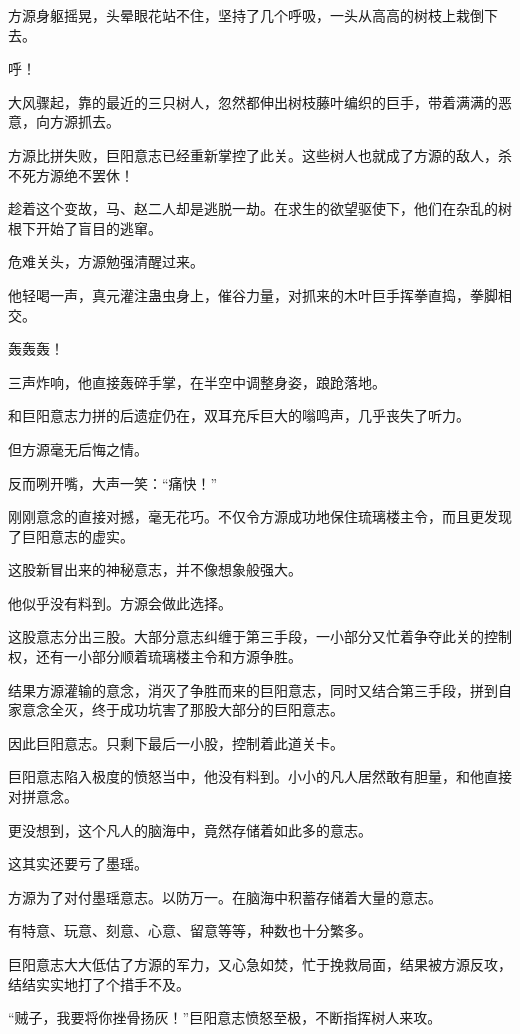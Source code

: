\begin{this_body}
方源身躯摇晃，头晕眼花站不住，坚持了几个呼吸，一头从高高的树枝上栽倒下去。

呼！

大风骤起，靠的最近的三只树人，忽然都伸出树枝藤叶编织的巨手，带着满满的恶意，向方源抓去。

方源比拼失败，巨阳意志已经重新掌控了此关。这些树人也就成了方源的敌人，杀不死方源绝不罢休！

趁着这个变故，马、赵二人却是逃脱一劫。在求生的欲望驱使下，他们在杂乱的树根下开始了盲目的逃窜。

危难关头，方源勉强清醒过来。

他轻喝一声，真元灌注蛊虫身上，催谷力量，对抓来的木叶巨手挥拳直捣，拳脚相交。

轰轰轰！

三声炸响，他直接轰碎手掌，在半空中调整身姿，踉跄落地。

和巨阳意志力拼的后遗症仍在，双耳充斥巨大的嗡鸣声，几乎丧失了听力。

但方源毫无后悔之情。

反而咧开嘴，大声一笑：“痛快！”

刚刚意念的直接对撼，毫无花巧。不仅令方源成功地保住琉璃楼主令，而且更发现了巨阳意志的虚实。

这股新冒出来的神秘意志，并不像想象般强大。

他似乎没有料到。方源会做此选择。

这股意志分出三股。大部分意志纠缠于第三手段，一小部分又忙着争夺此关的控制权，还有一小部分顺着琉璃楼主令和方源争胜。

结果方源灌输的意念，消灭了争胜而来的巨阳意志，同时又结合第三手段，拼到自家意念全灭，终于成功坑害了那股大部分的巨阳意志。

因此巨阳意志。只剩下最后一小股，控制着此道关卡。

巨阳意志陷入极度的愤怒当中，他没有料到。小小的凡人居然敢有胆量，和他直接对拼意念。

更没想到，这个凡人的脑海中，竟然存储着如此多的意志。

这其实还要亏了墨瑶。

方源为了对付墨瑶意志。以防万一。在脑海中积蓄存储着大量的意志。

有特意、玩意、刻意、心意、留意等等，种数也十分繁多。

巨阳意志大大低估了方源的军力，又心急如焚，忙于挽救局面，结果被方源反攻，结结实实地打了个措手不及。

“贼子，我要将你挫骨扬灰！”巨阳意志愤怒至极，不断指挥树人来攻。


\end{this_body}
